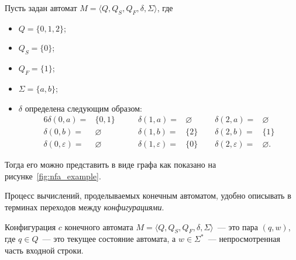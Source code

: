 \begin{example}\label{exmpl:NFA}
    Пусть задан автомат $M=\langle Q, Q_S, Q_F, \delta, \Sigma\rangle$, где
    \begin{itemize}
        \item $Q = \{0,1,2\}$;
        \item $Q_S = \{0\}$;
        \item $Q_F = \{1\}$;
        \item $\Sigma = \{a,b\}$;
        \item $\delta$ определена следующим образом:
        \begin{alignat*}{6}
            \delta(0,a) =& \{0,1\}      \qquad    & \delta(1,a) =& \varnothing \qquad & \delta(2,a) =& \varnothing \\
            \delta(0,b) =& \varnothing           & \delta(1,b) =& \{2\}             & \delta(2,b) =& \{1\} \\
            \delta(0,\varepsilon) =& \varnothing & \delta(1,\varepsilon) =& \{0\}   & \delta(2,\varepsilon) =& \varnothing.
        \end{alignat*}
    \end{itemize}
    Тогда его можно представить в виде графа как показано на рисунке~\ref{fig:nfa_example}.
    \begin{marginfigure}
        \begin{center}
            
        \end{center}
        \caption{Пример конечного автомата в котором состояние $0$~--- стартовое, а состояние $1$~--- финальное}
        \label{fig:nfa_example}
    \end{marginfigure}
\end{example}

Процесс вычислений, проделываемых конечным автоматом, удобно описывать в терминах переходов между \emph{конфигурациями}.

\begin{definition}[Конфигурация]
    Конфигурация $c$ конечного автомата $M = \langle Q, Q_S, Q_F, \delta, \Sigma \rangle$~--- это пара $(q, w)$, где $q\in Q$~--- это текущее состояние автомата, а $w \in \Sigma^*$~--- непросмотренная часть входной строки.
\end{definition}

